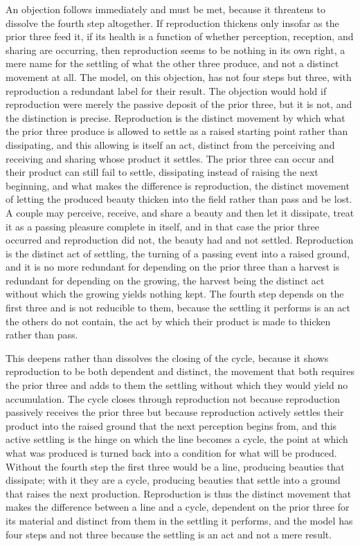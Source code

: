 An objection follows immediately and must be met, because it threatens to dissolve the fourth step altogether. If reproduction thickens only insofar as the prior three feed it, if its health is a function of whether perception, reception, and sharing are occurring, then reproduction seems to be nothing in its own right, a mere name for the settling of what the other three produce, and not a distinct movement at all. The model, on this objection, has not four steps but three, with reproduction a redundant label for their result. The objection would hold if reproduction were merely the passive deposit of the prior three, but it is not, and the distinction is precise. Reproduction is the distinct movement by which what the prior three produce is allowed to settle as a raised starting point rather than dissipating, and this allowing is itself an act, distinct from the perceiving and receiving and sharing whose product it settles. The prior three can occur and their product can still fail to settle, dissipating instead of raising the next beginning, and what makes the difference is reproduction, the distinct movement of letting the produced beauty thicken into the field rather than pass and be lost. A couple may perceive, receive, and share a beauty and then let it dissipate, treat it as a passing pleasure complete in itself, and in that case the prior three occurred and reproduction did not, the beauty had and not settled. Reproduction is the distinct act of settling, the turning of a passing event into a raised ground, and it is no more redundant for depending on the prior three than a harvest is redundant for depending on the growing, the harvest being the distinct act without which the growing yields nothing kept. The fourth step depends on the first three and is not reducible to them, because the settling it performs is an act the others do not contain, the act by which their product is made to thicken rather than pass.

This deepens rather than dissolves the closing of the cycle, because it shows reproduction to be both dependent and distinct, the movement that both requires the prior three and adds to them the settling without which they would yield no accumulation. The cycle closes through reproduction not because reproduction passively receives the prior three but because reproduction actively settles their product into the raised ground that the next perception begins from, and this active settling is the hinge on which the line becomes a cycle, the point at which what was produced is turned back into a condition for what will be produced. Without the fourth step the first three would be a line, producing beauties that dissipate; with it they are a cycle, producing beauties that settle into a ground that raises the next production. Reproduction is thus the distinct movement that makes the difference between a line and a cycle, dependent on the prior three for its material and distinct from them in the settling it performs, and the model has four steps and not three because the settling is an act and not a mere result.

